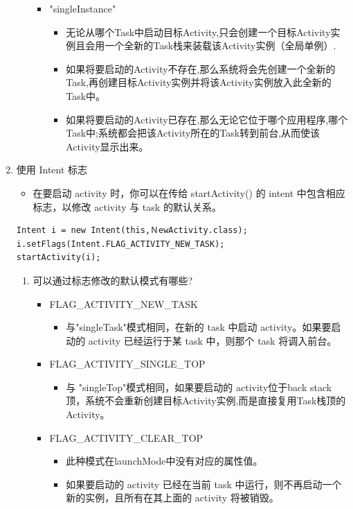 \documentclass[9pt, b5paper]{article}
\begin{document}
\begin{enumerate}
\begin{enumerate}
\begin{itemize}
\begin{itemize}
\end{itemize}
\item "singleInstance"　
\begin{itemize}
\item 无论从哪个Task中启动目标Activity,只会创建一个目标Activity实例且会用一个全新的Task栈来装载该Activity实例（全局单例）.
\item 如果将要启动的Activity不存在,那么系统将会先创建一个全新的Task,再创建目标Activity实例并将该Activity实例放入此全新的Task中。
\item 如果将要启动的Activity已存在,那么无论它位于哪个应用程序,哪个Task中;系统都会把该Activity所在的Task转到前台,从而使该Activity显示出来。
\end{itemize}
\end{itemize}
\end{enumerate}
\item 使用 Intent 标志
\label{sec-1-3-3-2}
\begin{itemize}
\item 在要启动 activity 时，你可以在传给 startActivity() 的 intent 中包含相应标志，以修改 activity 与 task 的默认关系。
\end{itemize}
\begin{verbatim}
Intent i = new Intent(this,ＮewActivity.class);
i.setFlags(Intent.FLAG_ACTIVITY_NEW_TASK);
startActivity(i);
\end{verbatim}
\begin{enumerate}
\item 可以通过标志修改的默认模式有哪些?
\label{sec-1-3-3-2-1}
\begin{itemize}
\item FLAG\_ACTIVITY\_NEW\_TASK
\begin{itemize}
\item 与"singleTask"模式相同，在新的 task 中启动 activity。如果要启动的 activity 已经运行于某 task 中，则那个 task 将调入前台。
\end{itemize}
\item FLAG\_ACTIVITY\_SINGLE\_TOP
\begin{itemize}
\item 与 "singleTop"模式相同，如果要启动的 activity位于back stack 顶，系统不会重新创建目标Activity实例,而是直接复用Task栈顶的Activity。
\end{itemize}
\item FLAG\_ACTIVITY\_CLEAR\_TOP
\begin{itemize}
\item 此种模式在launchMode中没有对应的属性值。
\item 如果要启动的 activity 已经在当前 task 中运行，则不再启动一个新的实例，且所有在其上面的 activity 将被销毁。

\end{itemize}
\end{itemize}
\end{enumerate}
\end{enumerate}
\end{document}
